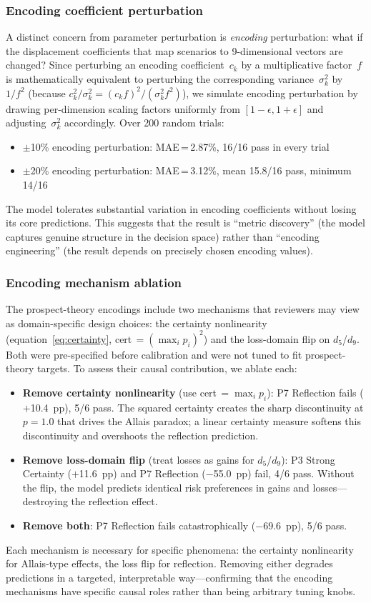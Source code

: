 \documentclass[journal]{IEEEtran}
\begin{document}
\subsubsection{Encoding coefficient perturbation}
A distinct concern from parameter perturbation is \emph{encoding} perturbation: what if the displacement coefficients that map scenarios to 9-dimensional vectors are changed?
Since perturbing an encoding coefficient~$c_k$ by a multiplicative factor~$f$ is mathematically equivalent to perturbing the corresponding variance~$\sigma_k^2$ by~$1/f^2$ (because $c_k^2/\sigma_k^2 = (c_k f)^2 / (\sigma_k^2 f^2)$), we simulate encoding perturbation by drawing per-dimension scaling factors uniformly from $[1-\epsilon, 1+\epsilon]$ and adjusting~$\sigma_k^2$ accordingly.
Over 200 random trials:
\begin{itemize}
    \item $\pm$10\% encoding perturbation: MAE\,=\,2.87\%, 16/16 pass in every trial
    \item $\pm$20\% encoding perturbation: MAE\,=\,3.12\%, mean 15.8/16 pass, minimum 14/16
\end{itemize}
The model tolerates substantial variation in encoding coefficients without losing its core predictions.
This suggests that the result is ``metric discovery'' (the model captures genuine structure in the decision space) rather than ``encoding engineering'' (the result depends on precisely chosen encoding values).

\subsubsection{Encoding mechanism ablation}
The prospect-theory encodings include two mechanisms that reviewers may view as domain-specific design choices: the certainty nonlinearity (equation~\eqref{eq:certainty}, cert\,$= (\max_i p_i)^2$) and the loss-domain flip on $d_5$/$d_9$.
Both were pre-specified before calibration and were not tuned to fit prospect-theory targets.
To assess their causal contribution, we ablate each:
\begin{itemize}
    \item \textbf{Remove certainty nonlinearity} (use cert\,$= \max_i p_i$): P7 Reflection fails ($+$10.4~pp), 5/6 pass.
    The squared certainty creates the sharp discontinuity at $p = 1.0$ that drives the Allais paradox; a linear certainty measure softens this discontinuity and overshoots the reflection prediction.
    \item \textbf{Remove loss-domain flip} (treat losses as gains for $d_5$/$d_9$): P3 Strong Certainty ($+$11.6~pp) and P7 Reflection ($-$55.0~pp) fail, 4/6 pass.
    Without the flip, the model predicts identical risk preferences in gains and losses---destroying the reflection effect.
    \item \textbf{Remove both}: P7 Reflection fails catastrophically ($-$69.6~pp), 5/6 pass.
\end{itemize}
Each mechanism is necessary for specific phenomena: the certainty nonlinearity for Allais-type effects, the loss flip for reflection.
Removing either degrades predictions in a targeted, interpretable way---confirming that the encoding mechanisms have specific causal roles rather than being arbitrary tuning knobs.
\end{document}
